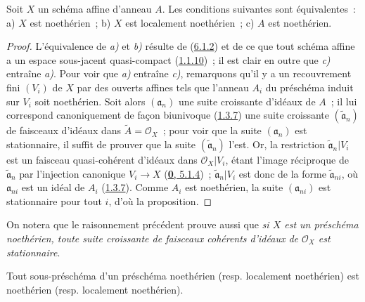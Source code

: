 \begin{proposition}[6.1.3]
\label{I.6.1.3-fr}
Soit $X$ un schéma affine d'anneau $A$. Les conditions suivantes sont
équivalentes~: \textup{a)} $X$ est noethérien~; \textup{b)} $X$ est localement noethérien~;
\textup{c)} $A$ est noethérien.
\end{proposition}

\begin{proof}
L'équivalence de \emph{a)} et \emph{b)} résulte de (\hyperref[I.6.1.2-fr]{6.1.2}) et de ce
que tout schéma affine a un espace sous-jacent quasi-compact
(\hyperref[I.1.1.10-fr]{1.1.10})~; il est clair en outre que \emph{c)} entraîne \emph{a)}.
Pour voir que \emph{a)} entraîne \emph{c)}, remarquons qu'il y a un recouvrement fini
$(V_i)$ de $X$ par des ouverts affines tels que l'anneau $A_i$ du préschéma
induit sur $V_i$ soit noethérien. Soit alors $(\mathfrak{a}_n)$ une suite
croissante d'idéaux de $A$~; il lui correspond canoniquement de façon
biunivoque (\hyperref[I.1.3.7-fr]{1.3.7}) une suite croissante
$(\widetilde{\mathfrak{a}}_n)$ de faisceaux d'idéaux dans
$\widetilde{A}=\mathscr{O}_X$~; pour voir que la suite
$(\mathfrak{a}_n)$ est stationnaire, il suffit de prouver que la suite
$(\widetilde{\mathfrak{a}}_n)$ l'est. Or, la restriction
$\widetilde{\mathfrak{a}}_n|V_i$ est un faisceau quasi-cohérent d'idéaux dans
$\mathscr{O}_X|V_i$, étant l'image réciproque de
$\widetilde{\mathfrak{a}}_n$ par l'injection canonique $V_i\to X$
(\hyperref[0.5.1.4-fr]{\textbf{0}, 5.1.4})~; $\widetilde{\mathfrak{a}}_n|V_i$ est
donc de la forme $\widetilde{\mathfrak{a}}_{ni}$, où $\mathfrak{a}_{ni}$ est
un idéal de $A_i$ (\hyperref[I.1.3.7-fr]{1.3.7}). Comme $A_i$ est noethérien,
la suite $(\mathfrak{a}_{ni})$ est stationnaire pour tout $i$, d'où la
proposition.
\end{proof}

On notera que le raisonnement précédent prouve aussi que \emph{si $X$ est un
préschéma noethérien, toute suite croissante de faisceaux cohérents d'idéaux
de $\mathscr{O}_X$ est stationnaire}.

\begin{proposition}[6.1.4]
\label{I.6.1.4-fr}
Tout sous-préschéma d'un préschéma noethérien \textup{(resp.} localement noethérien)
est noethérien \textup{(resp.} localement noethérien).
\end{proposition}

